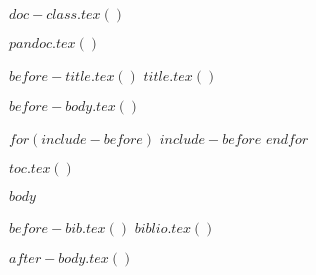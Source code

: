 $doc-class.tex()$

$pandoc.tex()$

$before-title.tex()$
$title.tex()$



$before-body.tex()$

$for(include-before)$
$include-before$
$endfor$

$toc.tex()$

$body$

$before-bib.tex()$
$biblio.tex()$

$after-body.tex()$


